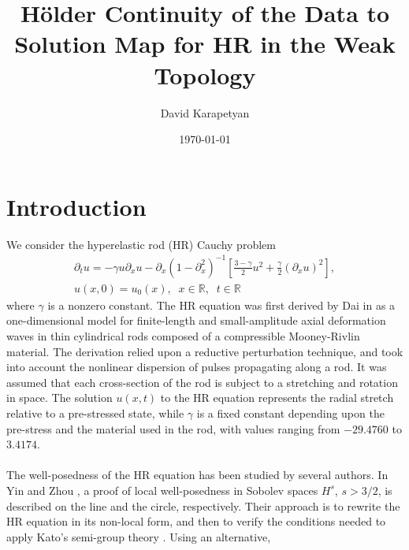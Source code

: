 \documentclass[12pt,reqno]{amsart}
\numberwithin{equation}{section}  %
\numberwithin{figure}{section}
\newcommand{\rr}{\mathbb{R}}
\newcommand{\p}{\partial}
\begin{document}
\title[H\"older Continuity of the Data to Solution Map for HR]{H\"older Continuity of the Data to Solution Map for HR in the
Weak Topology}
\author{David Karapetyan}
\address{Department of Mathematics  \\
    University  of Notre Dame\\
        Notre Dame, IN 46556 }
        \date{\today}
        \maketitle
        \section{Introduction}
%
%
%
We consider the hyperelastic rod (HR) Cauchy problem
\begin{gather}
 \p_t u =  -\gamma u \p_x u -
 \p_{x} (1 - \p_{x}^{2})^{-1} \left[ \frac{3-\gamma}{2}u^2 +
\frac{\gamma}{2} \left( \p_x u \right)^2
\right],
\label{hyperelastic-rod-equation}
\\
 u(x,0) = u_0(x), \; \; x \in \rr, \; \; t \in \rr
\label{init-cond}
\end{gather}
%
%
where  $\gamma$  is a  nonzero constant. The HR equation was first
derived by Dai in \cite{Dai_1998_Model-equations} as a one-dimensional 
model for finite-length and
small-amplitude axial deformation waves in thin cylindrical
rods composed of a compressible Mooney-Rivlin
material. The derivation relied upon a reductive perturbation technique, 
and took into account the nonlinear dispersion of pulses propagating 
along a rod. It was assumed that each cross-section of the rod is 
subject to a stretching and rotation in space. The solution $u(x,t)$ to the 
HR equation represents the radial stretch relative
to a pre-stressed state, while $\gamma$ is a fixed constant depending upon 
the pre-stress and the material used in
the rod, with values ranging from $- 29.4760$ to $3.4174$.
%
\\
\\
The well-posedness of the HR equation has been studied by several authors. 
In Yin \cite{Yin_2003_On-the-Cauchy-p} and Zhou 
\cite{Zhou_2005_Local-well-pose}, a proof of local well-posedness in Sobolev 
spaces $H^s$,  $s > 3/2$, is described  on the line and the circle, respectively. 
Their approach is to rewrite the HR equation   
in its non-local form, and then to verify the conditions needed to apply 
Kato's semi-group theory \cite{Kato_1975_Quasi-linear-eq}. Using an alternative,
\end{document}
